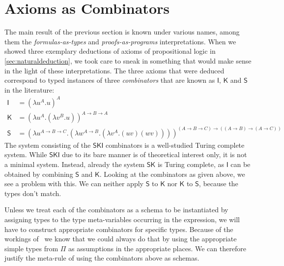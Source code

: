 \section{Axioms as Combinators}

The main result of the previous section is known under various names, among them
the \textit{formulas-as-types} and \textit{proofs-as-programs} interpretations.
When we showed three exemplary deductions of axioms of propositional logic in
\ref{sec:naturaldeduction}, we took care to sneak in something that would make
sense in the light of these interpretations. The three axioms that were deduced
correspond to typed instances of three \textit{combinators} that are known as
$\mathsf{I}$, $\mathsf{K}$ and $\mathsf{S}$ in the literature:
\begin{align*}
\mathsf{I} &=
  (\lambda u^A.u)^A \\
\mathsf{K} &=
  (\lambda u^A.
     (\lambda v^B.u)
  )^{A \to B \to A} \\
\mathsf{S} &=
  (\lambda u^{A \to B \to C}.
     (\lambda w^{A \to B}.
       (\lambda v^A.(uv)(wv))
     )
  )^{(A \to B \to C) \to ((A \to B) \to (A \to C))}
\end{align*}
The system consisting of the $\mathsf{SKI}$ combinators is a well-studied Turing
complete system. While $\mathsf{SKI}$ due to its bare manner is of theoretical
interest only, it is not a minimal system. Instead, already the system
$\mathsf{SK}$ is Turing complete, as $\mathsf{I}$ can be obtained by combining
$\mathsf{S}$ and $\mathsf{K}$. Looking at the combinators as given above, we see
a problem with this. We can neither apply $\mathsf{S}$ to $\mathsf{K}$ nor
$\mathsf{K}$ to $\mathsf{S}$, because the types don't match.

Unless we treat each of the combinators as a schema to be instantiated by
assigning types to the type meta-variables occurring in the expression, we will
have to construct appropriate combinators for specific types. Because of the
workings of \implnpi\ we know that we could always do that by using the
appropriate simple types from $\Pi$ as assumptions in the appropriate places. We
can therefore justify the meta-rule of using the combinators above as schemas.


